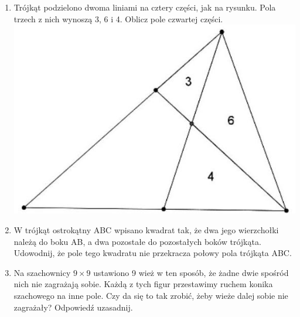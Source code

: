 \documentclass[10pt]{article}
\begin{document}
\begin{enumerate}
  \item Trójkąt podzielono dwoma liniami na cztery części, jak na rysunku. Pola trzech z nich wynoszą 3, 6 i 4. Oblicz pole czwartej części.\\
\includegraphics[max width=\textwidth, center]{2024_11_21_b4be4f78af681b2945efg-1}
  \item W trójkąt ostrokątny ABC wpisano kwadrat tak, że dwa jego wierzchołki należą do boku AB, a dwa pozostałe do pozostałych boków trójkąta. Udowodnij, że pole tego kwadratu nie przekracza połowy pola trójkąta ABC.
  \item Na szachownicy \(9 \times 9\) ustawiono 9 wież w ten sposób, że żadne dwie spośród nich nie zagrażają sobie. Każdą z tych figur przestawimy ruchem konika szachowego na inne pole. Czy da się to tak zrobić, żeby wieże dalej sobie nie zagrażały? Odpowiedź uzasadnij.
\end{enumerate}
\end{document}
